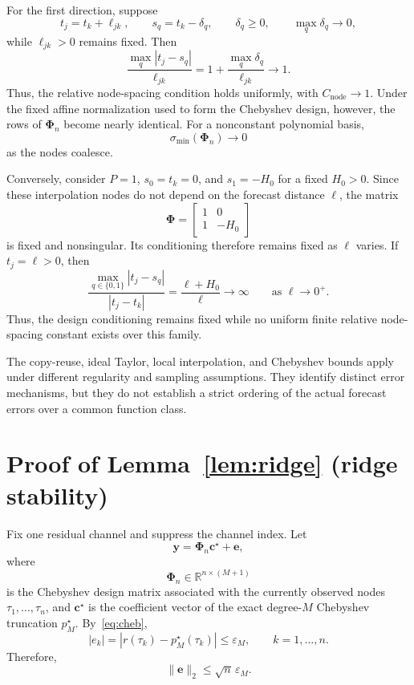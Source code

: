 For the first direction, suppose
\[
t_j=t_k+\ell_{jk},
\qquad
s_q=t_k-\delta_q,
\qquad
\delta_q\geq0,
\qquad
\max_q\delta_q\longrightarrow0,
\]
while $\ell_{jk}>0$ remains fixed. Then
\begin{equation}
\frac{
\max_q|t_j-s_q|
}{
\ell_{jk}
}
=
1+
\frac{\max_q\delta_q}{\ell_{jk}}
\longrightarrow1.
\end{equation}
Thus, the relative node-spacing condition holds uniformly, with
$C_{\mathrm{node}}\to1$. Under the fixed affine normalization used to
form the Chebyshev design, however, the rows of $\mathbf{\Phi}_n$
become nearly identical. For a nonconstant polynomial basis,
\begin{equation}
\sigma_{\min}(\mathbf{\Phi}_n)\longrightarrow0
\end{equation}
as the nodes coalesce.

Conversely, consider $P=1$, $s_0=t_k=0$, and $s_1=-H_0$ for a fixed
$H_0>0$. Since these interpolation nodes do not depend on the forecast
distance $\ell$, the matrix
\[
\mathbf{\Phi}
=
\begin{bmatrix}
1 & 0\\
1 & -H_0
\end{bmatrix}
\]
is fixed and nonsingular. Its conditioning therefore remains fixed as
$\ell$ varies. If $t_j=\ell>0$, then
\begin{equation}
\frac{
\max_{q\in\{0,1\}}|t_j-s_q|
}{
|t_j-t_k|
}
=
\frac{\ell+H_0}{\ell}
\longrightarrow\infty
\qquad
\text{as }\ell\to0^+.
\end{equation}
Thus, the design conditioning remains fixed while no uniform finite
relative node-spacing constant exists over this family.

The copy-reuse, ideal Taylor, local interpolation, and Chebyshev bounds
apply under different regularity and sampling assumptions. They
identify distinct error mechanisms, but they do not establish a strict
ordering of the actual forecast errors over a common function class.

\endgroup


\begingroup
\color{red}

\section{Proof of Lemma~\ref{lem:ridge} (ridge stability)}
\label{app:ridge}

Fix one residual channel and suppress the channel index. Let
\[
\mathbf{y}
=
\mathbf{\Phi}_n\mathbf{c}^\star+\mathbf{e},
\]
where
\[
\mathbf{\Phi}_n\in\mathbb{R}^{n\times(M+1)}
\]
is the Chebyshev design matrix associated with the currently observed
nodes $\tau_1,\ldots,\tau_n$, and $\mathbf{c}^\star$ is the coefficient
vector of the exact degree-$M$ Chebyshev truncation $p_M^\star$.
By~\eqref{eq:cheb},
\[
|e_k|
=
|r(\tau_k)-p_M^\star(\tau_k)|
\leq
\varepsilon_M,
\qquad
k=1,\ldots,n.
\]
Therefore,
\begin{equation}
\|\mathbf{e}\|_2
\leq
\sqrt{n}\,\varepsilon_M.
\label{eq:app-error-vector}
\end{equation}

